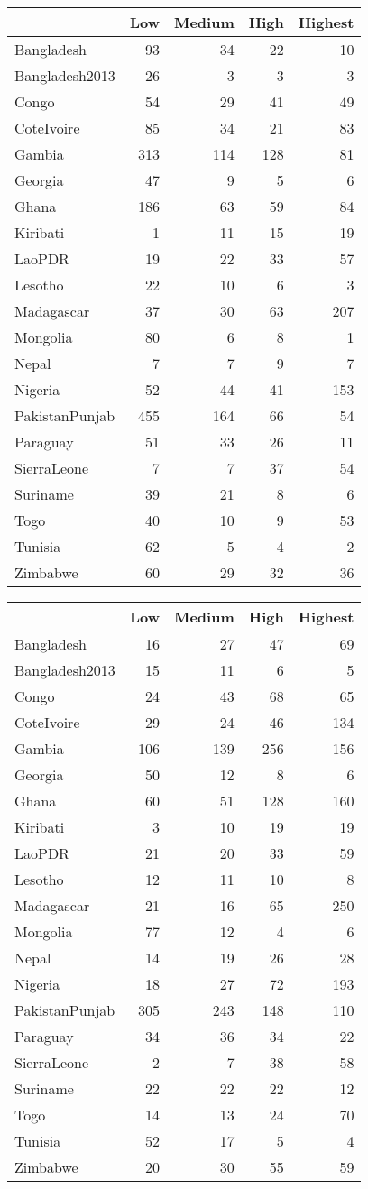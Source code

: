 \documentclass[
]{article}
\newenvironment{Shaded}{\begin{snugshade}}{\end{snugshade}}
\newcommand{\CommentTok}[1]{\textcolor[rgb]{0.56,0.35,0.01}{\textit{#1}}}
\newcommand{\DataTypeTok}[1]{\textcolor[rgb]{0.13,0.29,0.53}{#1}}
\newcommand{\DecValTok}[1]{\textcolor[rgb]{0.00,0.00,0.81}{#1}}
\newcommand{\KeywordTok}[1]{\textcolor[rgb]{0.13,0.29,0.53}{\textbf{#1}}}
\newcommand{\NormalTok}[1]{#1}
\newcommand{\OperatorTok}[1]{\textcolor[rgb]{0.81,0.36,0.00}{\textbf{#1}}}
\newcommand{\StringTok}[1]{\textcolor[rgb]{0.31,0.60,0.02}{#1}}
\begin{document}
\begin{longtable}[]{@{}lrrrr@{}}
\toprule
& Low & Medium & High & Highest\tabularnewline
\midrule
\endhead
Bangladesh & 93 & 34 & 22 & 10\tabularnewline
Bangladesh2013 & 26 & 3 & 3 & 3\tabularnewline
Congo & 54 & 29 & 41 & 49\tabularnewline
CoteIvoire & 85 & 34 & 21 & 83\tabularnewline
Gambia & 313 & 114 & 128 & 81\tabularnewline
Georgia & 47 & 9 & 5 & 6\tabularnewline
Ghana & 186 & 63 & 59 & 84\tabularnewline
Kiribati & 1 & 11 & 15 & 19\tabularnewline
LaoPDR & 19 & 22 & 33 & 57\tabularnewline
Lesotho & 22 & 10 & 6 & 3\tabularnewline
Madagascar & 37 & 30 & 63 & 207\tabularnewline
Mongolia & 80 & 6 & 8 & 1\tabularnewline
Nepal & 7 & 7 & 9 & 7\tabularnewline
Nigeria & 52 & 44 & 41 & 153\tabularnewline
PakistanPunjab & 455 & 164 & 66 & 54\tabularnewline
Paraguay & 51 & 33 & 26 & 11\tabularnewline
SierraLeone & 7 & 7 & 37 & 54\tabularnewline
Suriname & 39 & 21 & 8 & 6\tabularnewline
Togo & 40 & 10 & 9 & 53\tabularnewline
Tunisia & 62 & 5 & 4 & 2\tabularnewline
Zimbabwe & 60 & 29 & 32 & 36\tabularnewline
\bottomrule
\end{longtable}

\begin{Shaded}
\end{Shaded}

\begin{longtable}[]{@{}lrrrr@{}}
\toprule
& Low & Medium & High & Highest\tabularnewline
\midrule
\endhead
Bangladesh & 16 & 27 & 47 & 69\tabularnewline
Bangladesh2013 & 15 & 11 & 6 & 5\tabularnewline
Congo & 24 & 43 & 68 & 65\tabularnewline
CoteIvoire & 29 & 24 & 46 & 134\tabularnewline
Gambia & 106 & 139 & 256 & 156\tabularnewline
Georgia & 50 & 12 & 8 & 6\tabularnewline
Ghana & 60 & 51 & 128 & 160\tabularnewline
Kiribati & 3 & 10 & 19 & 19\tabularnewline
LaoPDR & 21 & 20 & 33 & 59\tabularnewline
Lesotho & 12 & 11 & 10 & 8\tabularnewline
Madagascar & 21 & 16 & 65 & 250\tabularnewline
Mongolia & 77 & 12 & 4 & 6\tabularnewline
Nepal & 14 & 19 & 26 & 28\tabularnewline
Nigeria & 18 & 27 & 72 & 193\tabularnewline
PakistanPunjab & 305 & 243 & 148 & 110\tabularnewline
Paraguay & 34 & 36 & 34 & 22\tabularnewline
SierraLeone & 2 & 7 & 38 & 58\tabularnewline
Suriname & 22 & 22 & 22 & 12\tabularnewline
Togo & 14 & 13 & 24 & 70\tabularnewline
Tunisia & 52 & 17 & 5 & 4\tabularnewline
Zimbabwe & 20 & 30 & 55 & 59\tabularnewline
\bottomrule
\end{longtable}
\end{document}
